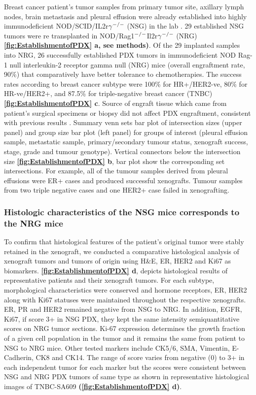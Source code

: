 Breast cancer patient's tumor samples from primary tumor site, axillary lymph nodes, brain metastasis and pleural effusion were already established into highly immunodeficient NOD/SCID/IL2r$\gamma^{\small{-/-}}$ (NSG) in the lab \cite{eirew2015dynamics}. 
29 established NSG tumors were re transplanted in NOD/Rag1$^{\small{-/-}}$Il2r$\gamma ^{\small{-/-}}$ (NRG) \cite{pearson2008non} \textbf{\autoref{fig:EstablishmentofPDX} a, see methods)}.
Of the 29 implanted samples into NRG, 26 successfully established PDX tumors in immunodeficient NOD Rag-1 null interleukin-2 receptor gamma null (NRG) mice (overall engraftment rate, 90\%) that comparatively have better tolerance to chemotherapies. 
The success rates according to breast cancer subtype were 100\% for HR+/HER2-ve, 80\% for HR-ve/HER2+, and 87.5\% for triple-negative breast cancer (TNBC) \textbf{\autoref{fig:EstablishmentofPDX} c}. Source of engraft tissue which came from patient's surgical specimens or biopsy did not affect PDX engraftment, consistent with previous results \cite{ryu2019integrative}. Summary venn sets bar plot of intersection sizes (upper panel) and group size bar plot (left panel) for groups of interest (pleural effusion sample, metastatic sample, primary/secondary tumour status, xenograft success, stage, grade and tumour genotype). Vertical connectors below the intersection size \textbf{\autoref{fig:EstablishmentofPDX} b},
bar plot show the corresponding set intersections. For example, all of the tumour samples derived from pleural effusions were ER+ cases and produced successful xenografts. Tumour samples from two triple negative cases and one HER2+ case failed in xenografting.


\subsubsection{Histologic characteristics of the NSG mice corresponds to the NRG mice}

To confirm that histological features of the patient's original tumor were stably retained in the xenograft, we conducted a comparative histological analysis of xenograft tumors and tumors of origin using H\&E, ER, HER2 and Ki67 as biomarkers. 
\textbf{\autoref{fig:EstablishmentofPDX} d}, depicts histological results of representative patients and their xenograft tumors. For each subtype, morphological characteristics were conserved and hormone receptors, ER, HER2 along with Ki67 statuses were maintained throughout the respective xenografts. ER, PR and HER2 remained negative from NSG to NRG. In addition, EGFR, Ki67, if score 3+ in NSG PDX, they kept the same intensity semiquantitative scores on NRG tumor sections. Ki-67 expression determines the growth fraction of a given cell population in the tumor and it remains the same from patient to NSG to NRG mice. Other tested markers include CK5/6, SMA, Vimentin, E-Cadherin, CK8 and CK14. The range of score varies from negative (0) to 3+ in each independent tumor for each marker but the scores were consistent between NSG and NRG PDX tumors of same type as shown in representative histological images of TNBC-SA609 \textbf{(\autoref{fig:EstablishmentofPDX} d)}.


